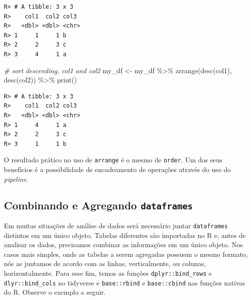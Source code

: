 \documentclass[
  11pt,
]{book}
\newenvironment{Shaded}{\begin{snugshade}}{\end{snugshade}}
\newcommand{\CommentTok}[1]{\textcolor[rgb]{0.37,0.37,0.37}{\textit{#1}}}
\newcommand{\FunctionTok}[1]{\textcolor[rgb]{0,0,0}{#1}}
\newcommand{\NormalTok}[1]{#1}
\newcommand{\OtherTok}[1]{\textcolor[rgb]{0.37,0.37,0.37}{#1}}
\newcommand{\SpecialCharTok}[1]{\textcolor[rgb]{0,0,0}{#1}}
\begin{document}
\begin{verbatim}
R> # A tibble: 3 x 3
R>    col1  col2 col3 
R>   <dbl> <dbl> <chr>
R> 1     1     1 b    
R> 2     2     3 c    
R> 3     4     1 a
\end{verbatim}

\begin{Shaded}
\begin{Highlighting}[]
\CommentTok{\# sort descending, col1 and col2}
\NormalTok{my\_df }\OtherTok{\textless{}{-}}\NormalTok{ my\_df }\SpecialCharTok{\%\textgreater{}\%}
  \FunctionTok{arrange}\NormalTok{(}\FunctionTok{desc}\NormalTok{(col1), }\FunctionTok{desc}\NormalTok{(col2)) }\SpecialCharTok{\%\textgreater{}\%}
  \FunctionTok{print}\NormalTok{()}
\end{Highlighting}
\end{Shaded}

\begin{verbatim}
R> # A tibble: 3 x 3
R>    col1  col2 col3 
R>   <dbl> <dbl> <chr>
R> 1     4     1 a    
R> 2     2     3 c    
R> 3     1     1 b
\end{verbatim}

O resultado prático no uso de \texttt{arrange} é o mesmo de \texttt{order}. Um dos seus benefícios é a possibilidade de encadeamento de operações através do uso do \emph{pipeline}.

\hypertarget{combinando-e-agregando-dataframes}{%
\subsection{\texorpdfstring{Combinando e Agregando \texttt{dataframes}}{Combinando e Agregando dataframes}}\label{combinando-e-agregando-dataframes}}

Em muitas situações de análise de dados será necessário juntar \texttt{dataframes} distintos em um único objeto. Tabelas diferentes são importadas no R e, antes de analisar os dados, precisamos combinar as informações em um único objeto. Nos casos mais simples, onde as tabelas a serem agregadas possuem o mesmo formato, nós as juntamos de acordo com as linhas, verticalmente, ou colunas, horizontalmente. Para esse fim, temos as funções \texttt{dplyr::bind\_rows} e \texttt{dlyr::bind\_cols} no tidyverse e \texttt{base::rbind} e \texttt{base::cbind} nas funções nativas do R. Observe o exemplo a seguir.  
\end{document}
